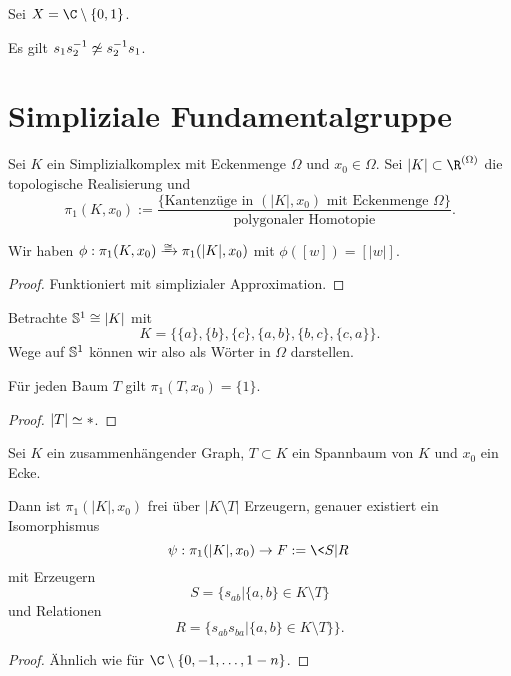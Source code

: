 \begin{ex}
	Sei $X = \C \setminus \{0, 1\}$.

	Es gilt $s_1s_2^{-1} \not\homotopic s_2^{-1} s_1$.
\end{ex}


\section{Simpliziale Fundamentalgruppe}


\begin{df}
	Sei $K$ ein Simplizialkomplex mit Eckenmenge $\Omega$ und $x_0 \in \Omega$.
	Sei $|K| \subset \R^{(\Omega)}$ die topologische Realisierung und
	\[
		\pi_1(K, x_0) := \dfrac{ \{ \text{Kantenzüge in $(|K|, x_0)$ mit Eckenmenge $\Omega$} \} }
		{ \text{polygonaler Homotopie} }.
	\]
\end{df}

\begin{st}
	Wir haben $\phi: \pi_1(K, x_0) \isomorphicto \pi_1(|K|, x_0)$ mit $\phi([w]) = [|w|]$.
	\begin{proof}
		Funktioniert mit simplizialer Approximation.
	\end{proof}
\end{st}

\begin{ex}
	Betrachte $\S^1 \homeomorphic |K|$ mit
	\[
		K = \Big\{ \{a\}, \{b\}, \{c\}, \{a, b\}, \{b, c\}, \{c, a\} \Big\}.
	\]
	Wege auf $\S^1$ können wir also als Wörter in $\Omega$ darstellen.
\end{ex}

\begin{st}
	Für jeden Baum $T$ gilt $\pi_1(T, x_0) = \{1\}$.
	\begin{proof}
		$|T| \homotopic *$.
	\end{proof}
\end{st}

\begin{st}
	Sei $K$ ein zusammenhängender Graph, $T \subset K$ ein Spannbaum von $K$ und $x_0$ ein Ecke.

	Dann ist $\pi_1(|K|, x_0)$ frei über $|K \setminus T|$ Erzeugern, genauer existiert ein Isomorphismus
	\[
		\psi: \pi_1(|K|, x_0) \to F := \< S | R \>
	\]
	mit Erzeugern
	\[
		S = \{ s_{ab} | \{a,b\} \in K \setminus T \}
	\]
	und Relationen
	\[
		R = \big\{ s_{ab} s_{ba} | \{a,b\} \in K \setminus T \} \big\}.
	\]
	\begin{proof}
		Ähnlich wie für $\C \setminus \{0, -1, \dotsc, 1-n \}$.
	\end{proof}
\end{st}

